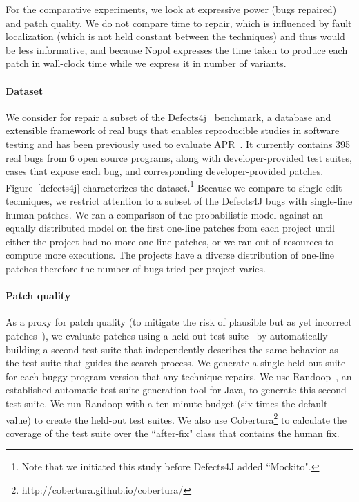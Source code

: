 \documentclass[conference]{IEEEtran}
\begin{document}
For the comparative experiments, we look at expressive power (bugs repaired) and
patch quality.  We do not compare time to repair, which is influenced by fault
localization (which is not held constant between the techniques) and thus would
be less informative, and because Nopol expresses the time taken to produce each patch in wall-clock time while we express it in number of variants.

\paragraph{Dataset}
We consider for repair a subset of the Defects4j~\cite{just14}
benchmark, a database and extensible 
framework of real bugs that enables reproducible studies in software testing and
has been previously used to evaluate APR~\cite{martinez2016}. 
It currently contains 395 real bugs from 6
open source programs, along with developer-provided test suites, cases that
expose each bug,  and
corresponding developer-provided patches.  Figure~\ref{defects4j} characterizes
the dataset.\footnote{Note that we initiated this study before Defects4J added
 ``Mockito".} Because we compare to single-edit techniques, we
restrict attention to a subset of the Defects4J bugs with single-line human
patches. We ran a comparison of the probabilistic model against an equally distributed model on the first one-line patches from each project until either the project had no more one-line patches, or we ran out of resources to compute more executions. The projects have a diverse distribution of one-line patches therefore the number of bugs tried per project varies. 

\paragraph{Patch quality}
As a proxy for patch quality (to mitigate the risk of plausible but as yet
incorrect patches~\cite{Qi15}), we evaluate patches using a held-out test
suite~\cite{legoues12Genprog,smith15} by automatically building a second test
suite that independently describes the same behavior as the test suite that
guides the search process. We generate a single held out suite for each buggy program version that any technique
repairs.  We use Randoop~\cite{pacheco07}, an established automatic
test suite generation tool for Java, to generate this second test suite. We run
Randoop with a ten minute budget (six times the default value) to create the
held-out test suites. We also use
Cobertura\footnote{http://cobertura.github.io/cobertura/} to calculate the
coverage of the test suite over the ``after-fix" class that contains the human fix.
\end{document}
